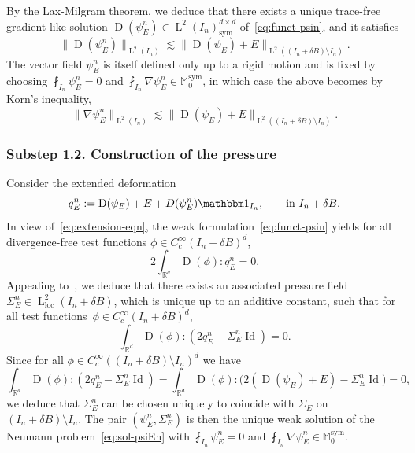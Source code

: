 \documentclass[JEP,XML,SOM,Unicode,published]{cedram}
\let\mathds\mathbbm
\theoremstyle{plain}
\theoremstyle{definition}
\newcommand{\R}{\mathbb R}
\newcommand{\Md}{\mathbb M}
\newcommand{\loc}{{\operatorname{loc}}}
\newcommand{\Id}{\operatorname{Id}}
\newcommand{\D}{\operatorname{D}}
\newcommand{\Ld}{\operatorname{L}}
\newcommand{\Sym}{{\operatorname{sym}}}
\newcommand{\substep}[1]{\subsubsection*{Substep #1}}
\begin{document}
By the Lax-Milgram theorem, we deduce that there exists a unique trace-free gradient-like solution $\D(\psi_E^{n})\in \Ld^2(I_n)^{d\times d}_\Sym$ of~\eqref{eq:funct-psin},
and it satisfies
\begin{equation*}
\|\!\D(\psi_E^{n})\|_{\Ld^2(I_n)}\lesssim \|\!\D(\psi_E)+E\|_{\Ld^2((I_n+\delta B)\setminus I_n)}.
\end{equation*}
The vector field $\psi_E^{n}$ is itself defined only up to a rigid motion and is fixed by choosing $\fint_{I_n}\psi_E^{n}=0$ and $\fint_{I_n}\nabla\psi_E^{n}\in\Md_0^\Sym$, in which case the above becomes by Korn's inequality,
\begin{equation}\label{eq:nabpsiEn}
\|\nabla\psi_E^{n}\|_{\Ld^2(I_n)}\lesssim \|\!\D(\psi_E)+E\|_{\Ld^2((I_n+\delta B)\setminus I_n)}.
\end{equation}

\substep{1.2. Construction of the pressure}
Consider the extended deformation
\[q_E^n:=\D(\psi_E)+E+D(\psi_E^n)\mathds1_{I_n},\qquad\text{in $I_n+\delta B$}.\]
In view of~\eqref{eq:extension-eqn}, the weak formulation~\eqref{eq:funct-psin} yields for all divergence-free test functions $\phi\in C^\infty_c(I_n+\delta B)^d$,
\[2\int_{\R^d}\D(\phi):q_E^n=0.\]
Appealing \eg to~\cite[Prop.\,12.10]{JKO94}, we deduce that there exists an associated pressure field $\Sigma_E^n\in\Ld^2_\loc(I_n+\delta B)$, which is unique up to an additive constant, such that for all test functions~$\phi\in C^\infty_c(I_n+\delta B)^d$,
\begin{equation}\label{eq:qtildeS}
\int_{\R^d}\D(\phi):(2q_E^n-\Sigma_E^n\Id)=0.
\end{equation}
Since for all $\phi\in C^\infty_c((I_n+\delta B)\setminus I_n)^d$ we have
\[\int_{\R^d}\D(\phi):(2q_E^n -\Sigma_E^n\Id)=\int_{\R^d}\D(\phi):\big(2(\D(\psi_E)+E)-\Sigma_E^n\Id\big)=0,\]
we deduce that $\Sigma_E^n$ can be chosen uniquely to coincide with $\Sigma_E$ on $(I_n+\delta B)\setminus I_n$.
The pair $(\psi_E^n,\Sigma_E^n)$ is then the unique weak solution of the Neumann problem~\eqref{eq:sol-psiEn} with $\fint_{I_n}\psi_E^{n}=0$ and $\fint_{I_n}\nabla\psi_E^{n}\in\Md^\Sym_0$.
\end{document}
